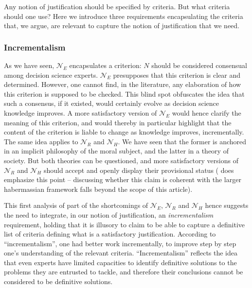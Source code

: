 \documentclass[preprint, french, english, 11pt, authoryear]{elsarticle}%
\begin{document}
Any notion of justification should be specified by criteria. But what criteria should one use? Here we introduce three requirements encapsulating the criteria that, we argue, are relevant to capture the notion of justification that we need.

\subsubsection{Incrementalism}
As we have seen, $\mathscr{N}_E$ encapsulates a criterion: $N$ should be considered consensual among decision science experts. $\mathscr{N}_E$ presupposes that this criterion is clear and determined. However, one cannot find, in the literature, any elaboration of how this criterion is supposed to be checked. 
This blind spot obfuscates the idea that such a consensus, if it existed, would certainly evolve as decision science knowledge improves. 
A more satisfactory version of $\mathscr{N}_E$ would hence clarify the meaning of this criterion, and would thereby in particular highlight that the content of the criterion is liable to change as knowledge improves, incrementally. The same idea applies to $\mathscr{N}_{R}$ and $\mathscr{N}_{H}$. 
We have seen that the former is anchored in an implicit philosophy of the moral subject, and the latter in a theory of society. 
But both theories can be questioned, and more satisfactory versions of $\mathscr{N}_{R}$ and $\mathscr{N}_{H}$ should accept and openly display their provisional status 
(\cite{habermas_moralbewustsein_1983} does emphasize this point -- discussing whether this claim is coherent with the larger habermassian framework falls beyond the scope of this article).

This first analysis of part of the shortcomings of $\mathscr{N}_E$, $\mathscr{N}_{R}$ and $\mathscr{N}_{H}$ hence suggests the need to integrate, in our notion of justification, an \emph{incrementalism} requirement, 
holding that it is illusory to claim to be able to capture a definitive list of criteria defining what is a satisfactory justification. According to “incrementalism”, one had better work incrementally, to improve step by step one's understanding of the relevant criteria. 
“Incrementalism” reflects the idea that even experts have limited capacities to identify definitive solutions to the problems they are entrusted to tackle, and therefore their conclusions cannot be considered to be definitive solutions.
\end{document}
